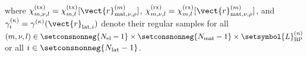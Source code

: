 where
$\chi_{m, \nu, l}^{(\text{tx})} = \chi_{m, l}^{(\text{tx})}[ \vect{r}_{\text{mat}, \nu, \rho}^{(m)} ]$,
$\chi_{m, \nu, l}^{(\text{rx})} = \chi_{m, l}^{(\text{rx})}[ \vect{r}_{\text{mat}, \nu, \rho}^{(m)} ]$, and
$\gamma_{i}^{(\kappa)} = \gamma^{(\kappa)}( \vect{r}_{\text{lat}, i} )$ denote
their regular samples for
all $( m, \nu, l ) \in \setconsnonneg{ N_{\text{el}} - 1 } \times \setconsnonneg{ N_{\text{mat}} - 1 } \times \setsymbol{L}_{ \text{BP} }^{(n)}$ or
all $i \in \setconsnonneg{ N_{\text{lat}} - 1 }$.
